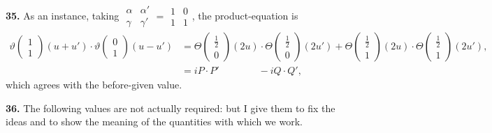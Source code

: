 \documentclass[11pt,a4paper]{book}
\begin{document}
\noindent\textbf{35.}\quad
As an instance, taking $\begin{matrix} \alpha & \alpha' \\ \gamma & \gamma' \end{matrix} = \begin{matrix} 1 & 0 \\ 1 & 1 \end{matrix}$, the product-equation is
\begin{align*}
\vartheta\begin{pmatrix} 1 \\ 1 \end{pmatrix}(u + u') \cdot \vartheta\begin{pmatrix} 0 \\ 1 \end{pmatrix}(u - u') &= \Theta\begin{pmatrix} \tfrac{1}{2} \\ 0 \end{pmatrix}(2u) \cdot \Theta\begin{pmatrix} \tfrac{1}{2} \\ 0 \end{pmatrix}(2u') + \Theta\begin{pmatrix} \tfrac{1}{2} \\ 1 \end{pmatrix}(2u) \cdot \Theta\begin{pmatrix} \tfrac{1}{2} \\ 1 \end{pmatrix}(2u'), \\
&= iP \cdot P' \qquad\qquad - iQ \cdot Q',
\end{align*}
which agrees with the before-given value.

\noindent\textbf{36.}\quad
The following values are not actually required: but I give them to fix the ideas and to show the meaning of the quantities with which we work.
\end{document}
